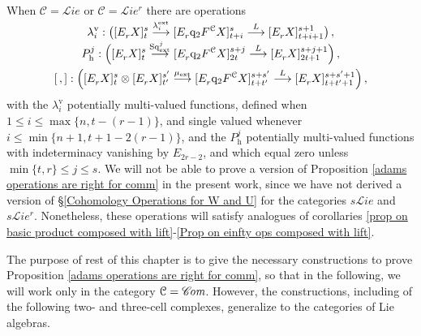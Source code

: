 \documentclass[11pt]{amsart} \renewcommand{\baselinestretch}{1.2}
\theoremstyle{plain}
\numberwithin{equation}{section} %
\theoremstyle{plain}
\numberwithin{equation}{chapter} %
\renewcommand{\to}{\longrightarrow}
\newcommand{\scrL}{\mathscr{L}}
\newcommand{\scrC}{\mathscr{C}}
\newcommand{\calc}{\mathcal{C}}
\newcommand{\quadgrad}[1]{\mathrm{q}_{#1}}
\newcommand{\Sq}{\mathrm{Sq}}
\newcommand{\algs}{{\scrC\!\textit{\normalfont\textit{om}}}}
\newcommand{\liealgs}{{\scrL\!\textit{ie}}}
\newcommand{\restliealgs}{{\scrL\!\textit{ie}^\textit{r}}}
\newcommand{\Edownup}[5]{[E_{#1}^{#2}#3]^{#4}_{#5}}
\newcommand{\uver}{^\mathrm{v}}
\newcommand{\dhor}{_\mathrm{h}}
\newcommand{\lambdav}{\lambda\uver}
\newcommand{\Ph}{P\dhor}
\begin{document}
\begin{Operations on the Bousfield-Kan spectral sequence}
When $\calc=\liealgs$ or $\calc=\restliealgs$ there are operations
\begin{gather*}
\lambdav_i:\left(\Edownup{r}{}{X}{s}{t} \smash{{}\overset{\lambda_i^\textup{ext}}{\to}{}} \Edownup{r}{}{\quadgrad{2}F^\calc X}{s}{t+i}\smash{{}\overset{L}{\to} {}}
\Edownup{r}{}{X}{s+1}{t+i+1}\right),
\\
\Ph^{j}:\left(\Edownup{r}{}{X}{s}{t}   \smash{{}\overset{\Sq^j_\textup{ext}}{\to}{}} \Edownup{r}{}{\quadgrad{2}F^\calc X}{s+j}{2t}\smash{{}\overset{L}{\to} {}}
\Edownup{r}{}{X}{s+j+1}{2t+1}\right),\\
[\,,]:\left(\Edownup{r}{}{X}{s}{t}\otimes \Edownup{r}{}{X}{s'}{t'}\smash{{}\overset{\mu_\textup{ext}}{\to}{}} \Edownup{r}{}{\quadgrad{2}F^\calc X}{s+s'}{t+t'}\smash{{}\overset{L}{\to} {}}
\Edownup{r}{}{X}{s+s'+1}{t+t'+1}\right),
\end{gather*}
with the $\lambdav_i$ potentially multi-valued functions,  defined when $1\leq i\leq \max\{n,t-(r-1)\}$, and single valued whenever $i\leq\min\{n+1,t+1-2(r-1)\}$, and the $\Ph^j$ potentially multi-valued functions with indeterminacy vanishing by $E_{2r-2}$, and which equal zero unless $\min\{t,r\}\leq j\leq s$. We will not be able to prove a version of Proposition \ref{adams operations are right for comm} in the present work, since we have not derived a version of \S\ref{Cohomology Operations for W and U} for the categories $s\liealgs$ and $s\restliealgs$. Nonetheless, these operations will satisfy analogues of corollaries \ref{prop on basic product composed with lift}-\ref{Prop on einfty ops composed with lift}.

The purpose of rest of this chapter is to give the necessary constructions to  prove Proposition \ref{adams operations are right for comm}, so that in the following, we will work only in the category $\calc=\algs$. However, the constructions, including of the following two- and three-cell complexes, generalize to the categories of Lie algebras.




\end{Operations on the Bousfield-Kan spectral sequence}
\end{document}
